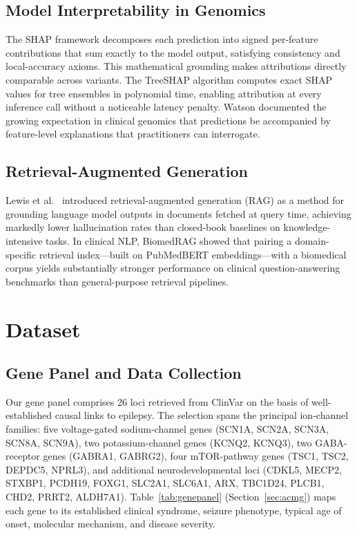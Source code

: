 \documentclass[conference]{IEEEtran}
\begin{document}
\subsection{Model Interpretability in Genomics}

The SHAP framework \cite{lundberg2017shap} decomposes each
prediction into signed per-feature contributions that sum exactly
to the model output, satisfying consistency and local-accuracy
axioms. This mathematical grounding makes attributions directly
comparable across variants. The TreeSHAP algorithm
\cite{lundberg2020trees} computes exact SHAP values for tree
ensembles in polynomial time, enabling attribution at every inference
call without a noticeable latency penalty. Watson \cite{watson2022}
documented the growing expectation in clinical genomics that
predictions be accompanied by feature-level explanations that
practitioners can interrogate.

\subsection{Retrieval-Augmented Generation}

Lewis et al.\ \cite{lewis2020rag} introduced retrieval-augmented
generation (RAG) as a method for grounding language model outputs
in documents fetched at query time, achieving markedly lower
hallucination rates than closed-book baselines on knowledge-intensive
tasks. In clinical NLP, BiomedRAG \cite{biomedrag2024} showed that
pairing a domain-specific retrieval index---built on PubMedBERT
\cite{pubmedbert2021} embeddings---with a biomedical corpus yields
substantially stronger performance on clinical question-answering
benchmarks than general-purpose retrieval pipelines.

\section{Dataset}

\subsection{Gene Panel and Data Collection}

Our gene panel comprises 26 loci retrieved from ClinVar
\cite{clinvar2018} on the basis of well-established causal links
to epilepsy. The selection spans the principal ion-channel
families: five voltage-gated sodium-channel genes (SCN1A, SCN2A,
SCN3A, SCN8A, SCN9A), two potassium-channel genes (KCNQ2, KCNQ3),
two GABA-receptor genes (GABRA1, GABRG2), four mTOR-pathway genes
(TSC1, TSC2, DEPDC5, NPRL3), and additional neurodevelopmental loci
(CDKL5, MECP2, STXBP1, PCDH19, FOXG1, SLC2A1, SLC6A1,
ARX, TBC1D24, PLCB1, CHD2, PRRT2, ALDH7A1).
Table~\ref{tab:genepanel} (Section~\ref{sec:acmg}) maps each gene
to its established clinical syndrome, seizure phenotype, typical
age of onset, molecular mechanism, and disease severity.
\end{document}
